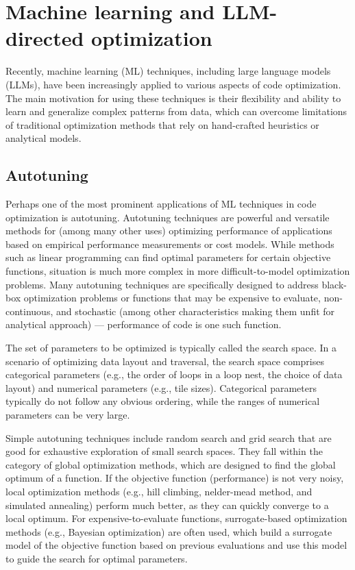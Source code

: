 \section{Machine learning and LLM-directed optimization}\label{sec:ml-directed-optimization}

Recently, machine learning (ML) techniques, including large language models (LLMs), have been increasingly applied to various aspects of code optimization. The main motivation for using these techniques is their flexibility and ability to learn and generalize complex patterns from data, which can overcome limitations of traditional optimization methods that rely on hand-crafted heuristics or analytical models.


\subsection{Autotuning}\label{sec:autotuning}


Perhaps one of the most prominent applications of ML techniques in code optimization is autotuning. Autotuning techniques are powerful and versatile methods for (among many other uses) optimizing performance of applications based on empirical performance measurements or cost models. While methods such as linear programming can find optimal parameters for certain objective functions, situation is much more complex in more difficult-to-model optimization problems. Many autotuning techniques are specifically designed to address black-box optimization problems or functions that may be expensive to evaluate, non-continuous, and stochastic (among other characteristics making them unfit for analytical approach) --- performance of code is one such function.

The set of parameters to be optimized is typically called the search space. In a scenario of optimizing data layout and traversal, the search space comprises categorical parameters (e.g., the order of loops in a loop nest, the choice of data layout) and numerical parameters (e.g., tile sizes). Categorical parameters typically do not follow any obvious ordering, while the ranges of numerical parameters can be very large.

Simple autotuning techniques include random search and grid search that are good for exhaustive exploration of small search spaces. They fall within the category of global optimization methods, which are designed to find the global optimum of a function. If the objective function (performance) is not very noisy, local optimization methods (e.g., hill climbing, nelder-mead method, and simulated annealing) perform much better, as they can quickly converge to a local optimum. For expensive-to-evaluate functions, surrogate-based optimization methods (e.g., Bayesian optimization) are often used, which build a surrogate model of the objective function based on previous evaluations and use this model to guide the search for optimal parameters.

